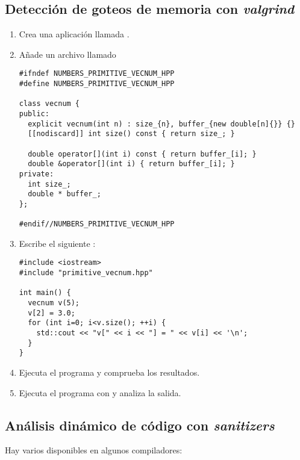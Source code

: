 \subsection{Detección de goteos de memoria con \emph{valgrind}}

\begin{enumerate}

\item
Crea una aplicación llamada .

\item Añade un archivo llamado 

\begin{lstlisting}
#ifndef NUMBERS_PRIMITIVE_VECNUM_HPP
#define NUMBERS_PRIMITIVE_VECNUM_HPP

class vecnum {
public:
  explicit vecnum(int n) : size_{n}, buffer_{new double[n]{}} {}
  [[nodiscard]] int size() const { return size_; }

  double operator[](int i) const { return buffer_[i]; }
  double &operator[](int i) { return buffer_[i]; }
private:
  int size_;
  double * buffer_;
};

#endif//NUMBERS_PRIMITIVE_VECNUM_HPP
\end{lstlisting}

\item
Escribe el siguiente :

\begin{lstlisting}
#include <iostream>
#include "primitive_vecnum.hpp"

int main() {
  vecnum v(5);
  v[2] = 3.0;
  for (int i=0; i<v.size(); ++i) {
    std::cout << "v[" << i << "] = " << v[i] << '\n';
  }
}
\end{lstlisting}

\item
Ejecuta el programa y comprueba los resultados.

\item
Ejecuta el programa con  y analiza la salida.

\end{enumerate}

\subsection{Análisis dinámico de código con \emph{sanitizers}}

Hay varios  disponibles en algunos compiladores:


